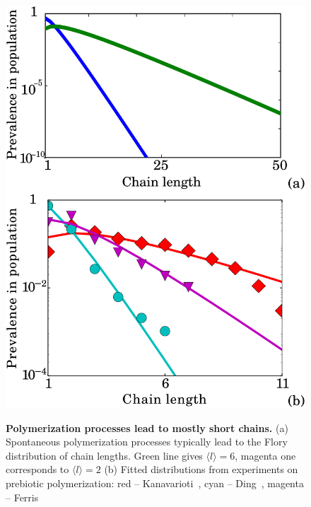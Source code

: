 \documentclass[5p,times]{elsarticle}
\begin{document}
\begin{figure}[h!]
  \centering
  \includegraphics[width=0.9\columnwidth]{pictures/flory-two.pdf} \\
  \caption{\textbf{Polymerization processes lead to mostly short chains.} (a)  Spontaneous 
polymerization processes typically lead to the Flory distribution of chain lengths. 
Green line gives $\langle  l \rangle= 6$, magenta one corresponds to $\langle l \rangle=2$
(b) Fitted distributions from experiments on prebiotic polymerization: red -- 
Kanavarioti~\cite{Kanavarioti2001}, cyan -- Ding~\cite{Ding1996}, 
magenta -- Ferris~\cite{Ferris1999}}
  \label{fig:flory}
\end{figure}

\end{document}
